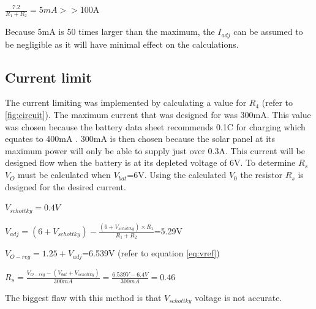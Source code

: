 \begin{center}
    
    $\frac{7.2}{R_1+R_2} = 5mA>>$100\textmu A
\end{center}
Because 5mA is 50 times larger than the maximum, the $I_{adj}$ can be assumed to be negligible as it will have minimal effect on the calculations.

\subsection{Current limit}

The current limiting was implemented by calculating a value for $R_4$ (refer to \ref{fig:circuit}). The maximum current that was designed for was 300mA. This value was chosen because the battery data sheet recommends 0.1C for charging which equates to 400mA \cite{RS}. 300mA is then chosen because the solar panel at its maximum power will only be able to supply just over 0.3A. This current will be designed flow when the battery is at its depleted voltage of 6V. To determine $R_s$ $V_O$ must be calculated when $V_{bat}$=6V. Using the calculated $V_0$ the resistor $R_s$ is designed for the desired current.



\begin{center}
 $V_{schottky}=0.4V$

\end{center}
\begin{center}

    $V_{adj} = (6+V_{schottky})-\frac{(6+V_{schottky})\times R_1}{R_1+R_2}$=5.29V
 
\end{center}
\begin{center}

    $V_{O-reg}= 1.25+V_{adj}$=6.539V (refer to equation \ref{eq:vref})
    
    
\end{center}
\begin{center}
    $R_s=\frac{V_{O-reg}-(V_{bat}+V_{schottky})}{300mA}=\frac{6.539V-6.4V}{300mA}=0.46$\textohm
\end{center}
The biggest flaw with this method is that $V_{schottky}$ voltage is not accurate.

